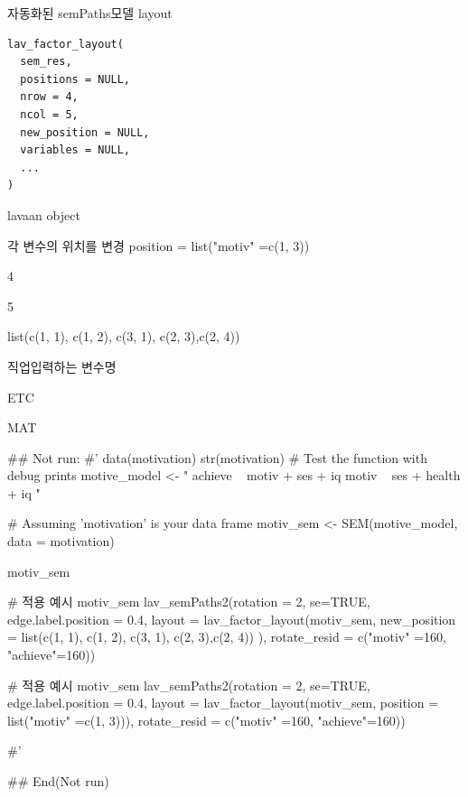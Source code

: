 \documentclass[a4paper]{book}
\begin{document}
%
\begin{Description}
자동화된 semPaths모델 layout
\end{Description}
%
\begin{Usage}
\begin{verbatim}
lav_factor_layout(
  sem_res,
  positions = NULL,
  nrow = 4,
  ncol = 5,
  new_position = NULL,
  variables = NULL,
  ...
)
\end{verbatim}
\end{Usage}
%
\begin{Arguments}
\begin{ldescription}
\item[\code{sem\_res}] lavaan object

\item[\code{positions}] 각 변수의 위치를 변경 position = list("motiv" =c(1, 3))

\item[\code{nrow}] 4

\item[\code{ncol}] 5

\item[\code{new\_position}] list(c(1, 1), c(1, 2), c(3, 1), c(2, 3),c(2, 4))

\item[\code{variables}] 직업입력하는 변수명

\item[\code{...}] ETC
\end{ldescription}
\end{Arguments}
%
\begin{Value}
MAT
\end{Value}
%
\begin{Examples}
\begin{ExampleCode}

\#\# Not run: 
#'
data(motivation)
str(motivation)
# Test the function with debug prints
motive_model <- "
achieve ~ motiv + ses + iq
motiv ~ ses + health + iq
"

# Assuming 'motivation' is your data frame
motiv_sem <- SEM(motive_model, data = motivation)

motiv_sem%

# 적용 예시
motiv_sem %
  lav_semPaths2(rotation = 2, se=TRUE,
  edge.label.position = 0.4,
                layout =
                lav_factor_layout(motiv_sem,
       new_position = list(c(1, 1), c(1, 2),
       c(3, 1), c(2, 3),c(2, 4)) ),
            rotate_resid = c("motiv" =160, "achieve"=160))


# 적용 예시
motiv_sem %
  lav_semPaths2(rotation = 2, se=TRUE,
  edge.label.position = 0.4,
                layout = lav_factor_layout(motiv_sem,
                                           position = list("motiv" =c(1, 3))),
                rotate_resid = c("motiv" =160, "achieve"=160))

#'

## End(Not run)

\end{ExampleCode}
\end{Examples}
\end{document}
